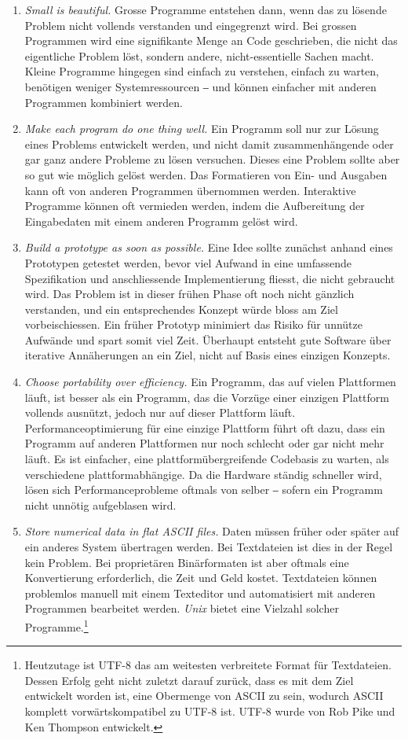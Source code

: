 \begin{enumerate}
    \item \textit{Small is beautiful.} Grosse Programme entstehen dann, wenn das zu lösende Problem nicht vollends verstanden und eingegrenzt wird. Bei grossen Programmen wird eine signifikante Menge an Code geschrieben, die nicht das eigentliche Problem löst, sondern andere, nicht-essentielle Sachen macht. Kleine Programme hingegen sind einfach zu verstehen, einfach zu warten, benötigen weniger Systemressourcen ‒ und können einfacher mit anderen Programmen kombiniert werden.
    \item \textit{Make each program do one thing well.} Ein Programm soll nur zur Lösung eines Problems entwickelt werden, und nicht damit zusammenhängende oder gar ganz andere Probleme zu lösen versuchen. Dieses eine Problem sollte aber so gut wie möglich gelöst werden. Das Formatieren von Ein- und Ausgaben kann oft von anderen Programmen übernommen werden. Interaktive Programme können oft vermieden werden, indem die Aufbereitung der Eingabedaten mit einem anderen Programm gelöst wird.
    \item \textit{Build a prototype as soon as possible.} Eine Idee sollte zunächst anhand eines Prototypen getestet werden, bevor viel Aufwand in eine umfassende Spezifikation und anschliessende Implementierung fliesst, die nicht gebraucht wird. Das Problem ist in dieser frühen Phase oft noch nicht gänzlich verstanden, und ein entsprechendes Konzept würde bloss am Ziel vorbeischiessen. Ein früher Prototyp minimiert das Risiko für unnütze Aufwände und spart somit viel Zeit. Überhaupt entsteht gute Software über iterative Annäherungen an ein Ziel, nicht auf Basis eines einzigen Konzepts.
    \item \textit{Choose portability over efficiency.} Ein Programm, das auf vielen Plattformen läuft, ist besser als ein Programm, das die Vorzüge einer einzigen Plattform vollends ausnützt, jedoch nur auf dieser Plattform läuft. Performanceoptimierung für eine einzige Plattform führt oft dazu, dass ein Programm auf anderen Plattformen nur noch schlecht oder gar nicht mehr läuft. Es ist einfacher, eine plattformübergreifende Codebasis zu warten, als verschiedene plattformabhängige. Da die Hardware ständig schneller wird, lösen sich Performanceprobleme oftmals von selber ‒ sofern ein Programm nicht unnötig aufgeblasen wird.
    \item \textit{Store numerical data in flat ASCII files.} Daten müssen früher oder später auf ein anderes System übertragen werden. Bei Textdateien ist dies in der Regel kein Problem. Bei proprietären Binärformaten ist aber oftmals eine Konvertierung erforderlich, die Zeit und Geld kostet. Textdateien können problemlos manuell mit einem Texteditor und automatisiert mit anderen Programmen bearbeitet werden. \textit{Unix} bietet eine Vielzahl solcher Programme.\footnote{Heutzutage ist UTF-8 das am weitesten verbreitete Format für Textdateien. Dessen Erfolg geht nicht zuletzt darauf zurück, dass es mit dem Ziel entwickelt worden ist, eine Obermenge von ASCII zu sein, wodurch ASCII komplett vorwärtskompatibel zu UTF-8 ist. UTF-8 wurde von Rob Pike und Ken Thompson entwickelt.}

\end{enumerate}

